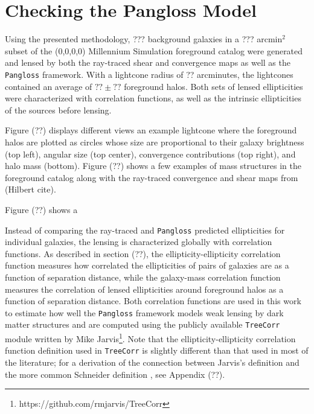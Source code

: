 \documentclass[%
 reprint,
 amsmath,amssymb,
 aps,nofootinbib
]{revtex4-1}
\begin{document}
\section{Checking the Pangloss Model}


Using the presented methodology, ??? background galaxies in a ??? arcmin$^2$ subset of the (0,0,0,0) Millennium Simulation foreground catalog were generated and lensed by both the ray-traced shear and convergence maps as well as the \texttt{Pangloss} framework. With a lightcone radius of ?? arcminutes, the lightcones contained an average of ${??\pm??}$ foreground halos. Both sets of lensed ellipticities were characterized with correlation functions, as well as the intrinsic ellipticities of the sources before lensing.

Figure (??) displays different views an example lightcone where the foreground halos are plotted as circles whose size are proportional to their galaxy brightness (top left), angular size (top center), convergence contributions (top right), and halo mass (bottom). Figure (??) shows a few examples of mass structures in the foreground catalog along with the ray-traced convergence and shear maps from (Hilbert cite). 

Figure (??) shows a 

Instead of comparing the ray-traced and \texttt{Pangloss} predicted ellipticities for individual galaxies, the lensing is characterized globally with correlation functions. As described in section (??), the ellipticity-ellipticity correlation function measures how correlated the ellipticities of pairs of galaxies are as a function of separation distance, while the galaxy-mass correlation function measures the correlation of lensed ellipticities around foreground halos as a function of separation distance. Both correlation functions are used in this work to estimate how well the \texttt{Pangloss} framework models weak lensing by dark matter structures and are computed using the publicly available \texttt{TreeCorr} module written by Mike Jarvis\footnote{https://github.com/rmjarvis/TreeCorr}. Note that the ellipticity-ellipticity correlation function definition used in \texttt{TreeCorr} is slightly different than that used in most of the literature; for a derivation of the connection between Jarvis's definition and the more common Schneider definition \cite{schneider}, see Appendix (??).
\end{document}
